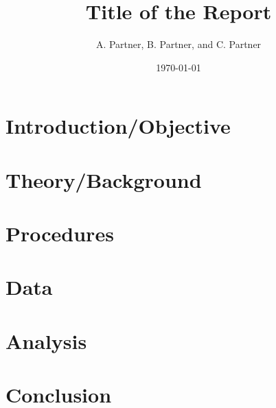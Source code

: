\documentclass[letterpaper,12pt]{article}
\begin{document}
\title{Title of the Report}
\author{A. Partner, B. Partner, and C. Partner}
\date{\today}
\maketitle

\begin{abstract}
\end{abstract}
\section{Introduction/Objective}
\section{Theory/Background}
\section{Procedures}
\section{Data}
\section{Analysis}
\section{Conclusion}




\end{document}
